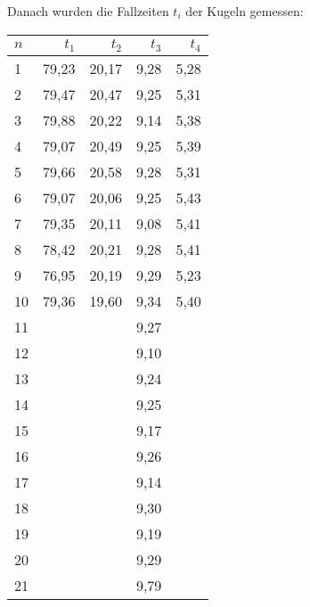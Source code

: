             Danach wurden die Fallzeiten $t_{i}$ der Kugeln gemessen:

            \begin{table}[H]
                \centering
                \begin{tabular}{|l||r|r|r|r|}
                    \hline
                    $n$ & $t_{1}$ & $t_{2}$ & $t_{3}$ & $t_{4}$\\
                    \hline \hline
                    1 & 79,23    & 20,17    & 9,28    & 5,28\\
                    2 & 79,47    & 20,47    & 9,25    & 5,31\\
                    3 & 79,88    & 20,22    & 9,14    & 5,38\\
                    4 & 79,07    & 20,49    & 9,25    & 5,39\\
                    5 & 79,66    & 20,58    & 9,28    & 5,31\\
                    6 & 79,07    & 20,06    & 9,25    & 5,43\\
                    7 & 79,35    & 20,11    & 9,08    & 5,41\\
                    8 & 78,42    & 20,21    & 9,28    & 5,41\\
                    9 & 76,95    & 20,19    & 9,29    & 5,23\\
                    10 & 79,36   & 19,60    & 9,34    & 5,40\\
                    11 &         &          & 9,27    &     \\
                    12 &         &          & 9,10    &     \\
                    13 &         &          & 9,24    &     \\
                    14 &         &          & 9,25    &     \\
                    15 &         &          & 9,17    &     \\
                    16 &         &          & 9,26    &     \\
                    17 &         &          & 9,14    &     \\
                    18 &         &          & 9,30    &     \\
                    19 &         &          & 9,19    &     \\
                    20 &         &          & 9,29    &     \\
                    21 &         &          & 9,79    &     \\

\end{tabular}
\end{table}
